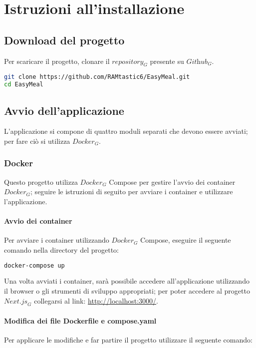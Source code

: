 \section{Istruzioni all'installazione}

\subsection{Download del progetto}
Per scaricare il progetto, clonare il $\textit{repository}_G$ presente su $\textit{Github}_G$.

\begin{lstlisting}[language=bash, caption=Download repository]
git clone https://github.com/RAMtastic6/EasyMeal.git
cd EasyMeal
\end{lstlisting}

\subsection{Avvio dell'applicazione}
L'applicazione si compone di quattro moduli separati che devono essere avviati; per fare ciò si utilizza $\textit{Docker}_G$.

\subsubsection{Docker}
Questo progetto utilizza $\textit{Docker}_G$ Compose per gestire l'avvio dei container $\textit{Docker}_G$; seguire le istruzioni di seguito per avviare i container e utilizzare l'applicazione.

\paragraph{Avvio dei container} Per avviare i container utilizzando $\textit{Docker}_G$ Compose, eseguire il seguente comando nella directory del progetto:

\begin{lstlisting}[language=bash, caption=Inizializzare i container]
docker-compose up
\end{lstlisting}
Una volta avviati i container, sarà possibile accedere all'applicazione utilizzando il browser o gli strumenti di sviluppo appropriati; per poter accedere al progetto $\textit{Next.js}_G$ collegarsi al link: \url{http://localhost:3000/}.

\paragraph{Modifica dei file Dockerfile e compose.yaml} Per applicare le modifiche e far partire il progetto utilizzare il seguente comando:

